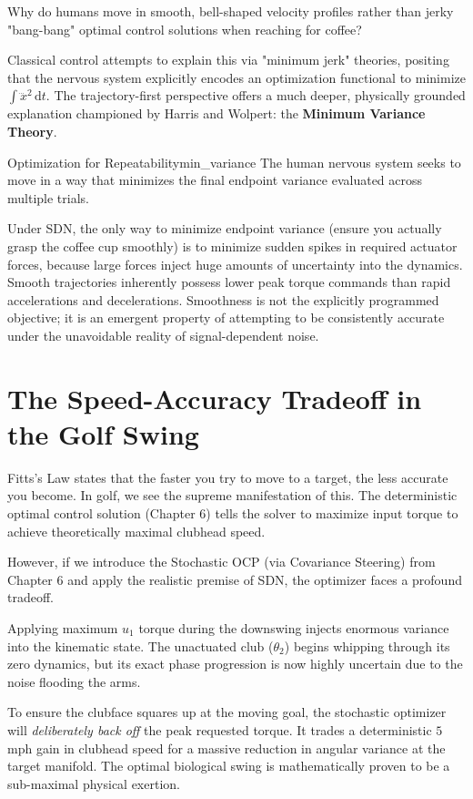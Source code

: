 \documentclass[12pt, openany]{book}
\theoremstyle{plain}
\newcommand{\dd}{\mathrm{d}}
\newcommand{\dt}{\,\dd t}
\begin{document}
Why do humans move in smooth, bell-shaped velocity profiles rather than jerky "bang-bang" optimal control solutions when reaching for coffee?

Classical control attempts to explain this via "minimum jerk" theories, positing that the nervous system explicitly encodes an optimization functional to minimize $\int \dddot{x}^2 \dt$. The trajectory-first perspective offers a much deeper, physically grounded explanation championed by Harris and Wolpert: the \textbf{Minimum Variance Theory}.

\begin{keyidea}{Optimization for Repeatability}{min_variance}
  The human nervous system seeks to move in a way that minimizes the final endpoint variance evaluated across multiple trials.
\end{keyidea}

Under SDN, the only way to minimize endpoint variance (ensure you actually grasp the coffee cup smoothly) is to minimize sudden spikes in required actuator forces, because large forces inject huge amounts of uncertainty into the dynamics. Smooth trajectories inherently possess lower peak torque commands than rapid accelerations and decelerations. Smoothness is not the explicitly programmed objective; it is an emergent property of attempting to be consistently accurate under the unavoidable reality of signal-dependent noise.

\section{The Speed-Accuracy Tradeoff in the Golf Swing}

Fitts's Law states that the faster you try to move to a target, the less accurate you become. In golf, we see the supreme manifestation of this. The deterministic optimal control solution (Chapter 6) tells the solver to maximize input torque to achieve theoretically maximal clubhead speed. 

However, if we introduce the Stochastic OCP (via Covariance Steering) from Chapter 6 and apply the realistic premise of SDN, the optimizer faces a profound tradeoff.

Applying maximum $u_1$ torque during the downswing injects enormous variance into the kinematic state. The unactuated club ($\theta_2$) begins whipping through its zero dynamics, but its exact phase progression is now highly uncertain due to the noise flooding the arms. 

To ensure the clubface squares up at the moving goal, the stochastic optimizer will \emph{deliberately back off} the peak requested torque. It trades a deterministic $5$ mph gain in clubhead speed for a massive reduction in angular variance at the target manifold. The optimal biological swing is mathematically proven to be a sub-maximal physical exertion.
\end{document}
